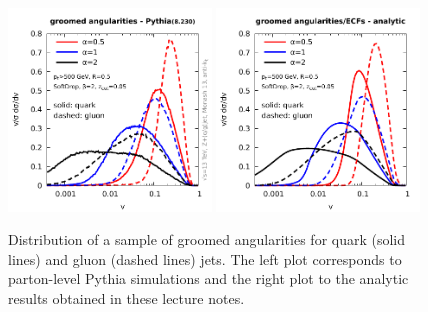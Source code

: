 \begin{figure}
  \includegraphics[width=0.48\textwidth,page=1]{figures/groomed-angularities-pythia.pdf}%
  \hfill%
  \includegraphics[width=0.48\textwidth,page=1]{figures/groomed-angularities-analytic.pdf}%
  \caption{Distribution of a sample of groomed angularities for quark
    (solid lines) and gluon (dashed lines) jets. The left plot
    corresponds to parton-level Pythia simulations and the right plot
    to the analytic results obtained in these lecture
    notes.}\label{fig:grm-ang-v-alpha}
\end{figure}  

